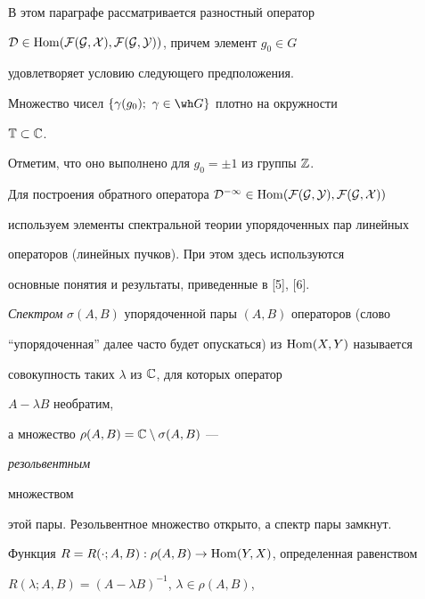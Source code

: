  


В этом параграфе рассматривается разностный оператор 


$\cal D\in\operatorname{Hom}(\cal F(G,X),\cal F(G,Y))$, причем элемент $g_0\in G$ 


удовлетворяет условию следующего предположения. 


 


\begin{assmp} 


Множество чисел $\{\gamma(g_0);\ \gamma\in\wh G\}$ плотно на окружности 


$\Bbb T\subset\Bbb C$. 


\end{assmp} 


 


Отметим, что оно выполнено для $g_0=\pm1$ из группы $\Bbb Z$. 


 


Для построения обратного оператора $\cal D^{-1}\in\Hom(\cal F(G,Y),\cal 


F(G,X))$ 


используем элементы спектральной теории упорядоченных пар линейных 


операторов (линейных пучков). При этом здесь используются 


основные понятия и результаты, приведенные в [5], [6]. 


 


{\it Спектром} $\sigma(A,B)$ упорядоченной пары $(A,B)$ операторов (слово 


``упорядоченная'' далее часто будет опускаться) из $\operatorname{Hom}(X,Y)$ называется 


совокупность таких $\lambda$ из $\Bbb C$, для которых оператор 


$A-\lambda B$ необратим, 


а множество $\rho(A,B)=\Bbb C\setminus\sigma(A,B)$ --- {\it резольвентным 


множеством} 


этой пары. Резольвентное множество открыто, а спектр пары замкнут. 


 


Функция $R=R(\cdot;A,B):\rho(A,B)\to\operatorname{Hom}(Y,X)$, определенная равенством 


$R(\lambda;A,B)=(A-\lambda B)^{-1}$, $\lambda\in\rho(A,B)$, 


